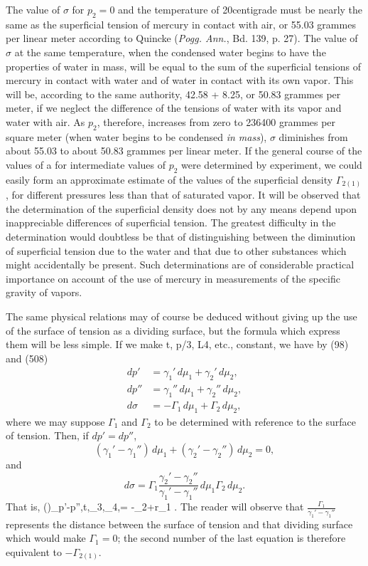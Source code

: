 \documentclass[12pt]{article}
\begin{document}
{{The value of $\sigma$ for $p_2=0$ and the temperature of 20\degree  centigrade must be nearly the same as the superficial tension of mercury in contact with air, or 55.03 grammes per linear meter according to Quincke (\textit{Pogg. Ann.}, Bd. 139, p. 27). The value of $\sigma$ at the same temperature, when the condensed water begins to have the properties of water in mass, will be equal to the sum of the superficial tensions of mercury in contact with water and of water in contact with its own vapor. This will be, according to the same authority, 42.58 + 8.25, or 50.83 grammes per meter, if we neglect the difference of the tensions of water with its vapor and water with air. As $p_2$, therefore, increases from zero to 236400 grammes per square meter (when water begins to be condensed \textit{in mass}), $\sigma$ diminishes from about 55.03 to about 50.83 grammes per linear meter. If the general course of the values of a for intermediate values of $p_2$ were determined by experiment, we could easily form an approximate estimate of the values of the superficial density $\Gamma_{2(1)}$, for different pressures less than that of saturated vapor. It will be observed that the determination of the superficial density does not by any means depend upon inappreciable differences of superficial tension. The greatest difficulty in the determination would doubtless be that of distinguishing between the diminution of superficial tension due to the water and that due to other substances which might accidentally be present. Such determinations are of considerable practical importance on account of the use of mercury in measurements of the specific gravity of vapors.}

The same physical relations may of course be deduced without giving up the use of the surface of tension as a dividing surface, but the formula which express them will be less simple. If we make t, p/3, L4, etc., constant, we have by (98) and (508)
\begin{align*}dp' &= \gamma_1'\, d\mu_1 + \gamma_2'\, d\mu_2, \\
dp'' &= \gamma_1''\, d\mu_1 + \gamma_2''\, d\mu_2, \\
d\sigma &= -\Gamma_1\, d\mu_1 + \Gamma_2\, d\mu_2,\end{align*}
where we may suppose $\Gamma_1$ and $\Gamma_2$ to be determined with reference to the surface of tension. Then, if $dp'=dp''$,
$$ (\gamma_1' - \gamma_1'')\, d\mu_1 + (\gamma_2' - \gamma_2'')\, d\mu_2  = 0, $$
and
$$ d\sigma = \Gamma_1 \frac{\gamma_2' - \gamma_2''}{\gamma_1' - \gamma_1''}\, d\mu_1   \Gamma_2\, d\mu_2.$$
That is,
\eqs \left(\right)_{p'-p'',t,\mu_3,\mu_4,}= -\Gamma_2+r\Gamma_1 . \label{515}\eqe
The reader will observe that $\frac{\Gamma_1}{\gamma_1' - \gamma_1''}$ represents the distance between the surface of tension and that dividing surface which would make $\Gamma_1 =0$; the second number of the last equation is therefore equivalent to $- \Gamma_{2(1)}$.

}
\end{document}
